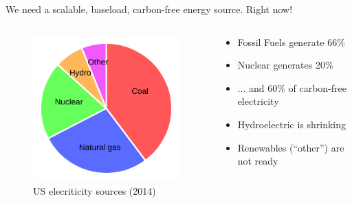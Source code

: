 \documentclass{beamer}
\begin{document}
        \begin{frame}{We need a scalable, baseload, carbon-free energy source.  Right now!}

            \begin{columns}[T]

                \begin{column}{0.5\textwidth}
                    \begin{figure}
                        \centering
                        \includegraphics[width=\textwidth]{./img/sources.pdf}
                        \caption*{US elecriticity sources (2014)}
                    \end{figure}
                \end{column}

                \begin{column}{0.5\textwidth}
                    \begin{itemize}
                        \item Fossil Fuels generate 66\%
                        \pause
                        \item Nuclear generates 20\%
                        \pause
                        \item ... and 60\% of carbon-free electricity
                        \pause
                        \item Hydroelectric is shrinking
                        \pause
                        \item Renewables (``other'') are not ready
                    \end{itemize}
                \end{column}

            \end{columns}

        \end{frame}
\end{document}
